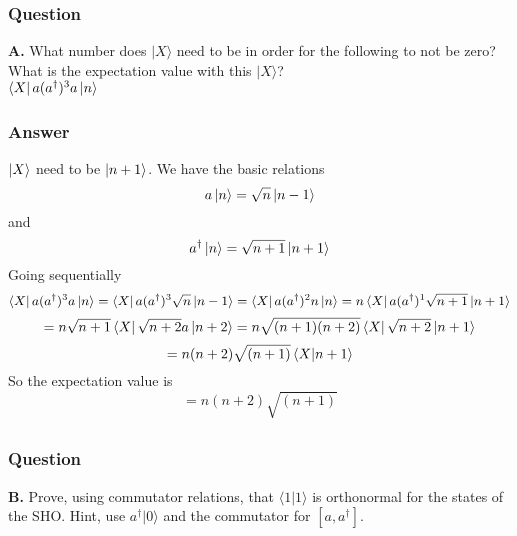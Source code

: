 \documentclass[12pt]{article}
\begin{document}
\subsubsection{Question}
\textbf{A.} What number does $|X\rangle$ need to be in order for the following to not be zero? What is the expectation value with this $|X\rangle$?\\
$\bra{X}a(a^{\dagger})^3a\ket{n}$
\subsubsection{Answer}
$\ket{X}$ need to be $\ket{n+1}$. We have the basic relations
\begin{equation}
    a\ket{n} = \sqrt{n}\ket{n-1}
\end{equation}
and
\begin{equation}
    a^{\dagger}\ket{n} = \sqrt{n+1}\ket{n+1}
\end{equation}
Going sequentially
\begin{equation}
    \bra{X}a(a^{\dagger})^3a\ket{n} = \bra{X}a(a^{\dagger})^3\sqrt{n}\ket{n-1} = \bra{X}a(a^{\dagger})^2n\ket{n}= n\bra{X}a(a^{\dagger})^1\sqrt{n+1}\ket{n+1} 
\end{equation}
\begin{equation}
    = n\sqrt{n+1}\bra{X}\sqrt{n+2}a \ket{n+2} = n\sqrt{(n+1)(n+2)}\bra{X}\sqrt{n+2}\ket{n+1}
\end{equation}
\begin{equation}
    = n(n+2)\sqrt{(n+1)}\bra{X}\ket{n+1}
\end{equation}
So the expectation value is
\begin{equation}
    =\boxed{n(n+2)\sqrt{(n+1)}}
\end{equation}
\subsection{}
\subsubsection{Question}
\textbf{B.} Prove, using commutator relations, that $\langle 1|1 \rangle$ is orthonormal for the states of the SHO. 
Hint, use $a^{\dagger}|0\rangle$ and the commutator for $[a, a^{\dagger}]$.
\end{document}
